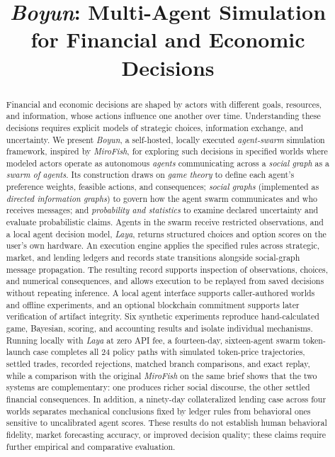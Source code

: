 \documentclass[10pt,conference,compsocconf]{IEEEtran}
\title{\textit{Boyun}: Multi-Agent Simulation\\for Financial and Economic Decisions}
\author{\IEEEauthorblockN{Cherry Q}}
\newcommand{\rev}[1]{{\color{revisedred}#1}}
\begin{document}
\raggedbottom
\maketitle
\begin{abstract}
Financial and economic decisions are shaped by actors with different goals,
resources, and information, whose actions influence one another over time.
Understanding these decisions requires explicit models of strategic choices,
information exchange, and uncertainty. We present \textit{Boyun}, a
self-hosted, locally executed \rev{\textit{agent-swarm}} simulation framework,
\rev{inspired by \textit{MiroFish},} for exploring such decisions in specified
worlds \rev{where modeled actors operate as autonomous \textit{agents}
communicating across a \textit{social graph} as a \textit{swarm of agents}}. Its
construction draws on \textit{game theory} to define \rev{each agent's}
preference weights, feasible actions, and consequences; \rev{\textit{social
graphs} (implemented as \textit{directed information graphs}) to govern how the
agent swarm communicates and} who receives messages; and \textit{probability and
statistics} to examine declared uncertainty and evaluate probabilistic claims.
\rev{Agents in the swarm} receive restricted observations, and a local
\rev{agent} decision model, \textit{Laya}, returns structured choices and option
scores on the user's own hardware. An execution engine applies the specified
rules across strategic, market, and lending ledgers and records state
transitions \rev{alongside social-graph message propagation}. The resulting
record supports inspection of observations, choices, and numerical consequences,
and allows execution to be replayed from saved decisions without repeating
inference. A local agent interface supports caller-authored worlds and offline
experiments, and an optional blockchain commitment supports later verification
of artifact integrity. Six synthetic experiments reproduce hand-calculated
game, Bayesian, scoring, and accounting results and isolate individual
mechanisms. Running locally with \textit{Laya} at zero API fee, a
fourteen-day, \rev{sixteen-agent swarm} token-launch case completes all 24
policy paths with \rev{simulated token-price trajectories,} settled trades,
recorded rejections, matched branch comparisons, and exact replay, while a
comparison with the original \textit{MiroFish} on the same brief shows that the
two systems are complementary: one produces richer social discourse, the other
settled financial consequences. In addition, a ninety-day collateralized lending
case across four worlds separates mechanical conclusions fixed by ledger rules
from behavioral ones sensitive to uncalibrated \rev{agent} scores. These results
do not establish human behavioral fidelity, market forecasting accuracy, or
improved decision quality; these claims require further empirical and
comparative evaluation.
\end{abstract}
\end{document}
